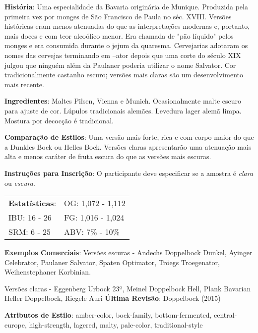 \textbf{História}: Uma especialidade da Bavaria originária de Munique. Produzida pela primeira vez por monges de São Francisco de Paula no séc. XVIII. Versões históricas eram menos atenuadas do que as interpretações modernas e, portanto, mais doces e com teor alcoólico menor. Era chamada de "pão líquido" pelos monges e era consumida durante o jejum da quaresma. Cervejarias adotaram os nomes das cervejas terminando em –ator depois que uma corte do século XIX julgou que ninguém além da Paulaner poderia utilizar o nome Salvator. Cor tradicionalmente castanho escuro; versões mais claras são um desenvolvimento mais recente.

\textbf{Ingredientes}: Maltes Pilsen, Vienna e Munich. Ocasionalmente malte escuro para ajuste de cor. Lúpulos tradicionais alemães. Levedura lager alemã limpa. Mostura por decocção é tradicional.

\textbf{Comparação de Estilos}: Uma versão mais forte, rica e com corpo maior do que a Dunkles Bock ou Helles Bock. Versões claras apresentarão uma atenuação mais alta e menos caráter de fruta escura do que as versões mais escuras.

\textbf{Instruções para Inscrição}: O participante deve especificar se a amostra é \textit{clara} ou \textit{escura}.

\begin{tabular}{@{}p{35mm}p{35mm}@{}}
  \textbf{Estatísticas}: & OG: 1,072 - 1,112 \\
  IBU: 16 - 26 & FG: 1,016 - 1,024 \\
  SRM: 6 - 25 & ABV: 7\% - 10\%
\end{tabular}

\textbf{Exemplos Comerciais}: Versões escuras - Andechs Doppelbock Dunkel, Ayinger Celebrator, Paulaner Salvator, Spaten Optimator, Tröegs Troegenator, Weihenstephaner Korbinian.

Versões claras - Eggenberg Urbock 23º, Meinel Doppelbock Hell, Plank Bavarian Heller Doppelbock, Riegele Auri
\textbf{Última Revisão}: Doppelbock (2015)

\textbf{Atributos de Estilo}: amber-color, bock-family, bottom-fermented, central-europe, high-strength, lagered, malty, pale-color, traditional-style
